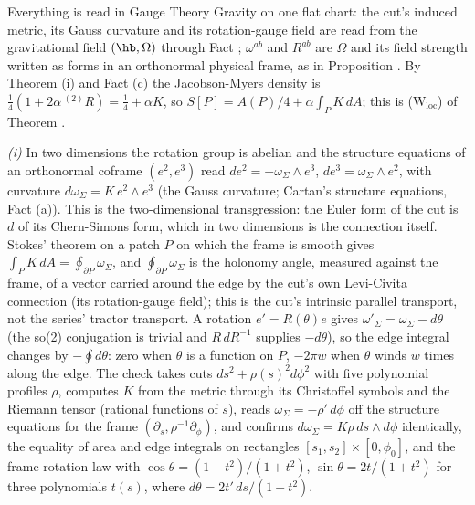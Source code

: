 Everything is read in Gauge Theory Gravity on one flat chart: the cut's induced metric, its Gauss curvature and its rotation-gauge field are read from the gravitational field $(\hb, \Omega)$ through Fact ; $\omega^{ab}$ and $R^{ab}$ are $\Omega$ and its field strength written as forms in an orthonormal physical frame, as in Proposition . By Theorem (i) and Fact (c) the Jacobson-Myers density is $\tfrac14(1 + 2\alpha\,{}^{(2)}\!R) = \tfrac14 + \alpha K$, so $S[P] = A(P)/4 + \alpha\int_{P}K\,dA$; this is (W$_{\mathrm{loc}}$) of Theorem .

\emph{(i)} In two dimensions the rotation group is abelian and the structure equations of an orthonormal coframe $(e^{2}, e^{3})$ read $de^{2} = -\omega_{\Sigma}\wedge e^{3}$, $de^{3} = \omega_{\Sigma}\wedge e^{2}$, with curvature $d\omega_{\Sigma} = K\,e^{2}\wedge e^{3}$ (the Gauss curvature; Cartan's structure equations, Fact (a)). This is the two-dimensional transgression: the Euler form of the cut is $d$ of its Chern-Simons form, which in two dimensions is the connection itself. Stokes' theorem on a patch $P$ on which the frame is smooth gives $\int_{P}K\,dA = \oint_{\partial P}\omega_{\Sigma}$, and $\oint_{\partial P}\omega_{\Sigma}$ is the holonomy angle, measured against the frame, of a vector carried around the edge by the cut's own Levi-Civita connection (its rotation-gauge field); this is the cut's intrinsic parallel transport, not the series' tractor transport. A rotation $e' = R(\theta)e$ gives $\omega'_{\Sigma} = \omega_{\Sigma} - d\theta$ (the so(2) conjugation is trivial and $R\,dR^{-1}$ supplies $-d\theta$), so the edge integral changes by $-\oint d\theta$: zero when $\theta$ is a function on $P$, $-2\pi w$ when $\theta$ winds $w$ times along the edge. The check takes cuts $ds^{2} + \rho(s)^{2}d\phi^{2}$ with five polynomial profiles $\rho$, computes $K$ from the metric through its Christoffel symbols and the Riemann tensor (rational functions of $s$), reads $\omega_{\Sigma} = -\rho'\,d\phi$ off the structure equations for the frame $(\partial_{s}, \rho^{-1}\partial_{\phi})$, and confirms $d\omega_{\Sigma} = K\rho\,ds\wedge d\phi$ identically, the equality of area and edge integrals on rectangles $[s_{1}, s_{2}]\times[0, \phi_{0}]$, and the frame rotation law with $\cos\theta = (1 - t^{2})/(1 + t^{2})$, $\sin\theta = 2t/(1 + t^{2})$ for three polynomials $t(s)$, where $d\theta = 2t'\,ds/(1 + t^{2})$.

